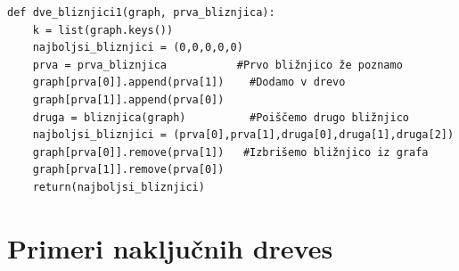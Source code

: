 \documentclass[a4paper,10pt]{article}
\begin{document}
\begin{verbatim}
def dve_bliznjici1(graph, prva_bliznjica):
    k = list(graph.keys())
    najboljsi_bliznjici = (0,0,0,0,0)
    prva = prva_bliznjica           #Prvo bližnjico že poznamo
    graph[prva[0]].append(prva[1])    #Dodamo v drevo
    graph[prva[1]].append(prva[0])
    druga = bliznjica(graph)          #Poiščemo drugo bližnjico
    najboljsi_bliznjici = (prva[0],prva[1],druga[0],druga[1],druga[2])
    graph[prva[0]].remove(prva[1])   #Izbrišemo bližnjico iz grafa
    graph[prva[1]].remove(prva[0])
    return(najboljsi_bliznjici)
\end{verbatim}



\section{Primeri naključnih dreves}
\end{document}
